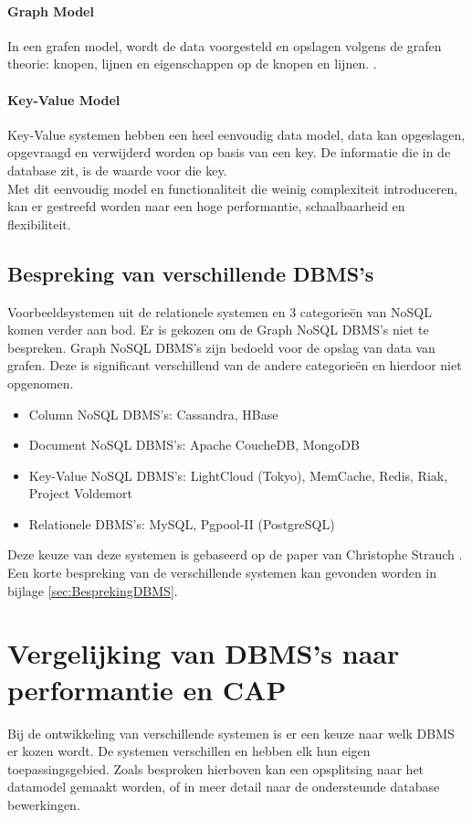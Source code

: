 \paragraph{Graph Model} In een grafen model, wordt de data voorgesteld en opslagen volgens de grafen theorie: knopen, lijnen en eigenschappen op de knopen en lijnen. \cite{bollacker2008freebase}.   

\paragraph{Key-Value Model} Key-Value systemen hebben een heel eenvoudig data model, data kan opgeslagen, opgevraagd en verwijderd worden op basis van een key. De informatie die in de database zit, is de waarde voor die key. \\
Met dit eenvoudig model en functionaliteit die weinig complexiteit introduceren, kan er gestreefd worden naar een hoge performantie, schaalbaarheid en flexibiliteit. \cite{Strauch.NoSQL}


\subsection{Bespreking van verschillende DBMS's}
Voorbeeldsystemen uit de relationele systemen en 3 categorieën van NoSQL komen verder aan bod. Er is gekozen om de Graph NoSQL DBMS's niet te bespreken. Graph NoSQL DBMS's zijn bedoeld voor de opslag van data van grafen. Deze is significant verschillend van de andere categorieën en hierdoor niet opgenomen. 
 
\begin{itemize}
\item Column NoSQL DBMS's: Cassandra, HBase
\item Document NoSQL DBMS's: Apache CoucheDB, MongoDB
\item Key-Value NoSQL DBMS's: LightCloud (Tokyo), MemCache, Redis, Riak, Project Voldemort
\item Relationele DBMS's: MySQL, Pgpool-II (PostgreSQL)
\end{itemize}

Deze keuze van deze systemen is gebaseerd op de paper van Christophe Strauch \cite{Strauch.NoSQL}. Een korte bespreking van de verschillende systemen kan gevonden worden in bijlage \ref{sec:BesprekingDBMS}.


\section{Vergelijking van DBMS's naar performantie en CAP}
Bij de ontwikkeling van verschillende systemen is er een keuze naar welk DBMS er kozen wordt. De systemen verschillen en hebben elk hun eigen toepassingsgebied. Zoals besproken hierboven kan een opsplitsing naar het datamodel gemaakt worden, of in meer detail naar de ondersteunde database bewerkingen. 

